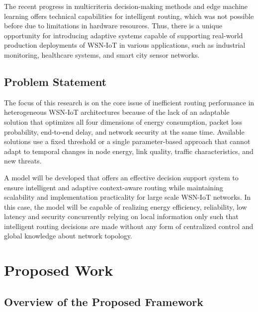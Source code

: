 \documentclass[a4paper,fleqn]{cas-dc}
\numberwithin{equation}{section}
\begin{document}
The recent progress in multicriteria decision-making methods and edge
machine learning offers technical capabilities for intelligent routing,
which was not possible before due to limitations in hardware resources.
\cite{R9_Tumula2025OptimizingIoTSDNBlockchain} Thus, there is a unique
opportunity for introducing adaptive systems capable of supporting
real-world production deployments of WSN-IoT in various applications,
such as industrial monitoring, healthcare systems, and smart city
sensor networks.

\subsection{Problem Statement}
\label{subsec:problem}

The focus of this research is on the core issue of inefficient routing performance in heterogeneous WSN-IoT architectures because of the lack of an adaptable solution that optimizes all four dimensions of energy consumption, packet loss probability, end-to-end delay, and network security at the same time.
\cite{R9_Tumula2025OptimizingIoTSDNBlockchain,R21_Pessoa2024RITAResilientIoT} Available solutions use a fixed threshold or a single parameter-based approach that cannot adapt to temporal changes in node energy, link quality, traffic characteristics, and new threats.

A model will be developed that offers an effective decision support system to ensure intelligent and adaptive context-aware routing while maintaining scalability and implementation practicality for large scale WSN-IoT networks. In this case, the model will be capable of realizing energy efficiency, reliability, low latency and security concurrently relying on local information only such that intelligent routing decisions are made without any form of centralized control and global knowledge about network topology.

\section{Proposed Work}
\label{sec:proposed}

\subsection{Overview of the Proposed Framework}
\label{subsec:overview}
\end{document}
